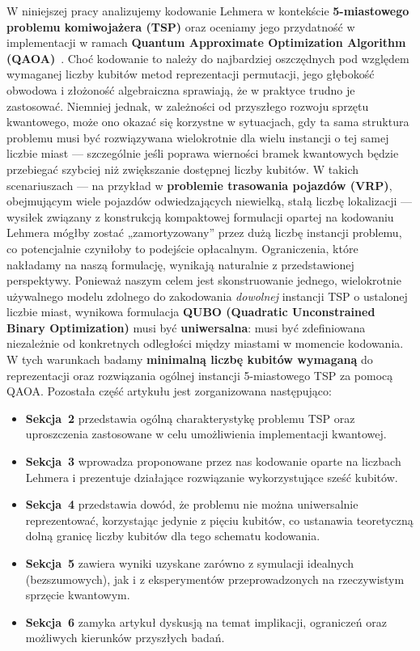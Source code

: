 W niniejszej pracy analizujemy kodowanie Lehmera w kontekście \textbf{5-miastowego problemu komiwojażera (TSP)} oraz oceniamy jego przydatność w implementacji w ramach \textbf{Quantum Approximate Optimization Algorithm (QAOA)}~\cite{farhi2014qaoa}. Choć kodowanie to należy do najbardziej oszczędnych pod względem wymaganej liczby kubitów metod reprezentacji permutacji, jego głębokość obwodowa i złożoność algebraiczna sprawiają, że w praktyce trudno je zastosować. Niemniej jednak, w zależności od przyszłego rozwoju sprzętu kwantowego, może ono okazać się korzystne w sytuacjach, gdy ta sama struktura problemu musi być rozwiązywana wielokrotnie dla wielu instancji o tej samej liczbie miast — szczególnie jeśli poprawa wierności bramek kwantowych będzie przebiegać szybciej niż zwiększanie dostępnej liczby kubitów. W takich scenariuszach — na przykład w \textbf{problemie trasowania pojazdów (VRP)}, obejmującym wiele pojazdów odwiedzających niewielką, stałą liczbę lokalizacji — wysiłek związany z konstrukcją kompaktowej formulacji opartej na kodowaniu Lehmera mógłby zostać „zamortyzowany” przez dużą liczbę instancji problemu, co potencjalnie czyniłoby to podejście opłacalnym.
Ograniczenia, które nakładamy na naszą formulację, wynikają naturalnie z przedstawionej perspektywy. Ponieważ naszym celem jest skonstruowanie jednego, wielokrotnie używalnego modelu zdolnego do zakodowania \emph{dowolnej} instancji TSP o ustalonej liczbie miast, wynikowa formulacja \textbf{QUBO (Quadratic Unconstrained Binary Optimization)} musi być \textbf{uniwersalna}: musi być zdefiniowana niezależnie od konkretnych odległości między miastami w momencie kodowania. W tych warunkach badamy \textbf{minimalną liczbę kubitów wymaganą} do reprezentacji oraz rozwiązania ogólnej instancji 5-miastowego TSP za pomocą QAOA.
Pozostała część artykułu jest zorganizowana następująco:
\begin{itemize}
\item \textbf{Sekcja~2} przedstawia ogólną charakterystykę problemu TSP oraz uproszczenia zastosowane w celu umożliwienia implementacji kwantowej.
\item \textbf{Sekcja~3} wprowadza proponowane przez nas kodowanie oparte na liczbach Lehmera i prezentuje działające rozwiązanie wykorzystujące sześć kubitów.
\item \textbf{Sekcja~4} przedstawia dowód, że problemu nie można uniwersalnie reprezentować, korzystając jedynie z pięciu kubitów, co ustanawia teoretyczną dolną granicę liczby kubitów dla tego schematu kodowania.
\item \textbf{Sekcja~5} zawiera wyniki uzyskane zarówno z symulacji idealnych (bezszumowych), jak i z eksperymentów przeprowadzonych na rzeczywistym sprzęcie kwantowym.
\item \textbf{Sekcja~6} zamyka artykuł dyskusją na temat implikacji, ograniczeń oraz możliwych kierunków przyszłych badań.
\end{itemize}

